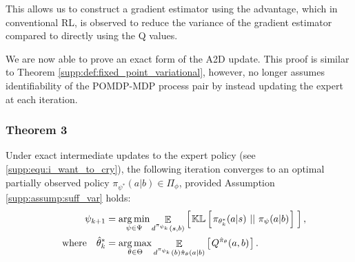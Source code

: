 This allows us to construct a gradient estimator using the advantage, which in conventional RL, is observed to reduce the variance of the gradient estimator compared to directly using the Q values.  

We are now able to prove an exact form of the A2D update.  This proof is similar to Theorem \ref{supp:def:fixed_point_variational}, however, no longer assumes identifiability of the POMDP-MDP process pair by instead updating the expert at each iteration.  

\subsubsection{Theorem 3}

\setcounter{theorem}{2}  
\begin{theorem}
\label{supp:def:exact_a2d}
Under exact intermediate updates to the expert policy (see \eqref{supp:equ:i_want_to_cry}), the following iteration converges to an optimal partially observed policy $\pi_{\psi^*}(a|b)\in\Pi_{\phi}$, provided Assumption \ref{supp:assump:suff_var} holds:
\begin{align}
    \psi_{k+1}  &= \mathop{\operatorname{arg\,min}}_{\psi \in \Psi} \mathop{\mathbb{E}}_{d^{\pi_{\psi_k}}(s,b)} \left[ \hspace*{0.1em}{}  \mathbb{KL} \left[ \hspace*{0.1em}{}  \pi_{\theta^*_k}(a|s) \ ||\ {} \pi_\psi(a|b) \hspace*{0.1em} \right]{} \hspace*{0.1em} \right]{} , \label{supp:equ:why_wont_it_stop}\\
    \quad \text{where }\ \   \hat{\theta}^*_k &= \mathop{\operatorname{arg\,max}}_{\theta \in \Theta} \mathop{\mathbb{E}}_{d^{{\pi_{\psi_k}}}(b) \hat{\pi}_{\theta}(a | b)} \left[ \hspace*{0.1em}{} Q^{{\hat{\pi}_{\theta}}}(a,b) \hspace*{0.1em} \right]{} . \label{supp:equ:i_want_to_cry}
\end{align}
\end{theorem}
\setcounter{theorem}{\value{sthe}}
